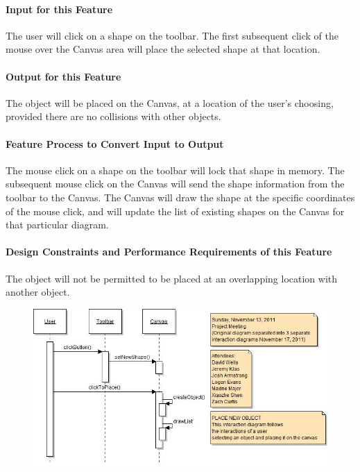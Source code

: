 \documentclass[twoside,letterpaper]{article}
\begin{document}
{\paragraph[Input for this Feature]{Input for this Feature}
{\color{black}
The user will click on a shape on the toolbar.  The first subsequent click of the mouse over the Canvas area will place the selected shape at that location.
}

\paragraph{Output for this Feature}
{\color{black}
The object will be placed on the Canvas, at a location of the user{\textquoteright}s choosing, provided there are no collisions with other objects.
}

\paragraph{Feature Process to Convert Input to Output}
{\color{black}
The mouse click on a shape on the toolbar will lock that shape in memory.
The subsequent mouse click on the Canvas will send the shape information from the toolbar to the Canvas.  
The Canvas will draw the shape at the specific coordinates of the mouse click, and will update the list of existing shapes on the Canvas for that particular diagram.
}

\paragraph{Design Constraints and Performance Requirements of this Feature}
{\color{black}
The object will not be permitted to be placed at an overlapping location with another object.
}
\bigskip
\bigskip

\begin{figure}[h]
\centering
\includegraphics[width=6.0in]{IntNewObj.jpg}
\end{figure}

}
\end{document}
